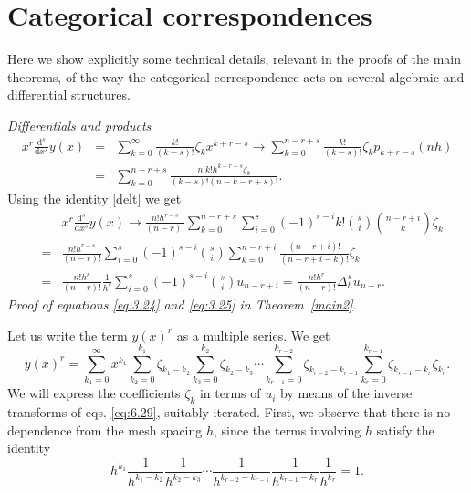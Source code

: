 \documentclass[10pt]{amsart}
\numberwithin{equation}{section}
\theoremstyle{definition}
\begin{document}
\section{Categorical correspondences}
\label{AppendixC}

Here we show explicitly some technical details, relevant in the proofs
of the main theorems, of the way the categorical correspondence acts on
several algebraic and differential structures.


\bigskip
\noindent
\textit{Differentials and products}
\begin{eqnarray}
x^{r}\frac{\mathrm{d}^{s}}{\mathrm{d}x^{s}}y(x)&=&\sum _{k=0}^{\infty}
\frac{k!}{(k-s)!} \zeta _{k} x^{k+r-s} \longrightarrow \sum _{k=0}^{n-r+s}
\frac{k!}{(k-s)!}\zeta _{k} p_{k+r-s}(nh)
\nonumber
\\
&=&\sum _{k=0}^{n-r+s}
\frac{n!k!h^{k+r-s} \zeta _{k} }{(k-s)!(n-k-r+s)!}.
\label{eqC.1}
\end{eqnarray}
Using the identity  \eqref{delt} we get
\begin{eqnarray}
&&x^{r}\frac{\mathrm{d}^{s}}{\mathrm{d}x^{s}}y(x) \longrightarrow
\frac{ n!h^{r-s}}{(n-r)!}\sum _{k=0}^{n-r+s}\sum _{i=0}^{s}(-1)^{s-i}k!
\binom{s}{i}\binom{n-r+i}{k} \zeta _{k}
\label{eqC.2}
\\
&=&
\nonumber
\frac{ n!h^{r-s}}{(n-r)!}\sum _{i=0}^{s}(-1)^{s-i}\binom{s}{i}\sum _{k=0}^{n-r+i}
\frac{(n-r+i)!}{ (n-r+i-k)!} \zeta _{k}
\\
&=&
\nonumber
\frac{ n!h^{r }}{(n-r)!}\frac{1}{h^{s}}\sum _{i=0}^{s}(-1)^{s-i}
\binom{s}{i}u_{n-r+i}=\frac{ n!h^{r}}{(n-r)!}\Delta ^{s}_{h}u_{n-r}.
\end{eqnarray}
\textit{Proof of equations  \eqref{eq:3.24} and  \eqref{eq:3.25} in Theorem~\ref{main2}}.



Let us write the term $y(x)^{r}$ as a multiple series. We get
\begin{equation}
\label{eq:B3}
y(x)^{r}=\sum _{k_{1}=0}^{\infty}x^{k_{1}}\sum _{k_{2}=0}^{k_{1}}
\zeta _{k_{1}-k_{2}} \sum _{k_{3}=0}^{k_{2}}\zeta _{k_{2}-k_{3}}
\cdots \sum _{k_{r-1}=0}^{k_{r-2}}\zeta _{k_{r-2}-k_{r-1}}\sum _{k_{r}=0}^{k_{r-1}}
\zeta _{k_{r-1}-k_{r}} \zeta _{k_{r}}.
\end{equation}
We will express the coefficients $\zeta _{k}$ in terms of $u_{i}$ by means
of the inverse transforms of eqs. \eqref{eq:6.29}, suitably iterated. First,
we observe that there is no dependence from the mesh spacing $h$, since
the terms involving $h$ satisfy the identity
\begin{equation}
h^{k_{1}}\frac{1}{h^{k_{1}-k_{2}}}\frac{1}{h^{k_{2}-k_{3}}}\cdots
\frac{1}{h^{k_{r-2}-k_{r-1}}}\frac{1}{h^{k_{r-1}-k_{r}}}
\frac{1}{h^{k_{r}}}=1.
\label{eqC.4}
\end{equation}
\end{document}
